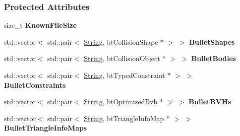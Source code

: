 \subsubsection*{Protected Attributes}
\begin{DoxyCompactItemize}
\item 
\hypertarget{classphys_1_1internal_1_1BulletFile_acc5d2fad35f5de8285d2718ef4810f6c}{
size\_\-t {\bfseries KnownFileSize}}
\label{classphys_1_1internal_1_1BulletFile_acc5d2fad35f5de8285d2718ef4810f6c}

\item 
\hypertarget{classphys_1_1internal_1_1BulletFile_a27074c0ada2979754653110d53c70d8f}{
std::vector$<$ std::pair$<$ \hyperlink{namespacephys_aa03900411993de7fbfec4789bc1d392e}{String}, btCollisionShape $\ast$ $>$ $>$ {\bfseries BulletShapes}}
\label{classphys_1_1internal_1_1BulletFile_a27074c0ada2979754653110d53c70d8f}

\item 
\hypertarget{classphys_1_1internal_1_1BulletFile_aa06c20e012deb7f7cae320d97104334e}{
std::vector$<$ std::pair$<$ \hyperlink{namespacephys_aa03900411993de7fbfec4789bc1d392e}{String}, btCollisionObject $\ast$ $>$ $>$ {\bfseries BulletBodies}}
\label{classphys_1_1internal_1_1BulletFile_aa06c20e012deb7f7cae320d97104334e}

\item 
\hypertarget{classphys_1_1internal_1_1BulletFile_a9735286a72dcdc0885d72db07e2ba3a0}{
std::vector$<$ std::pair$<$ \hyperlink{namespacephys_aa03900411993de7fbfec4789bc1d392e}{String}, btTypedConstraint $\ast$ $>$ $>$ {\bfseries BulletConstraints}}
\label{classphys_1_1internal_1_1BulletFile_a9735286a72dcdc0885d72db07e2ba3a0}

\item 
\hypertarget{classphys_1_1internal_1_1BulletFile_a6effca8b3d75b4253e1fa2f9557d381a}{
std::vector$<$ std::pair$<$ \hyperlink{namespacephys_aa03900411993de7fbfec4789bc1d392e}{String}, btOptimizedBvh $\ast$ $>$ $>$ {\bfseries BulletBVHs}}
\label{classphys_1_1internal_1_1BulletFile_a6effca8b3d75b4253e1fa2f9557d381a}

\item 
\hypertarget{classphys_1_1internal_1_1BulletFile_ae5f52ca26360b6f1143a46999255b6f2}{
std::vector$<$ std::pair$<$ \hyperlink{namespacephys_aa03900411993de7fbfec4789bc1d392e}{String}, btTriangleInfoMap $\ast$ $>$ $>$ {\bfseries BulletTriangleInfoMaps}}
\label{classphys_1_1internal_1_1BulletFile_ae5f52ca26360b6f1143a46999255b6f2}

\end{DoxyCompactItemize}


